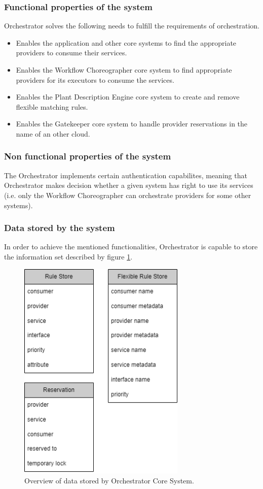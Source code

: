 \documentclass[a4paper]{arrowhead}
\begin{document}
\subsubsection {Functional properties of the system}
Orchestrator solves the following needs to fulfill the requirements of orchestration.

\begin{itemize}
    \item Enables the application and other core systems to find the appropriate providers to consume their services.
    \item Enables the Workflow Choreographer core system to find appropriate providers for its executors to consume the services.
    \item Enables the Plant Description Engine core system to create and remove flexible matching rules.
    \item Enables the Gatekeeper core system to handle provider reservations in the name of an other cloud.
\end{itemize}

\subsubsection {Non functional properties of the system}
The Orchestrator implements certain authentication capabilites, meaning that Orchestrator makes decision whether a given system has right to use its services (i.e. only the Workflow Choreographer can orchestrate providers for some other systems).

\subsubsection {Data stored by the system}
In order to achieve the mentioned functionalities, Orchestrator is capable to store the information set described by figure \ref{fig:information_overview}.

\begin{figure}[h!]
  \centering
  \includegraphics[width=8cm]{figures/orchestrator_data_overview.png}
  \caption{
    Overview of data stored by Orchestrator Core System.
  }
  \label{fig:information_overview}
\end{figure}
\end{document}

